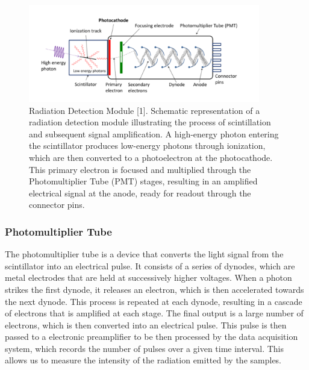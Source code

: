 \documentclass[12pt]{article}
\begin{document}
                \begin{figure}[!htb]
                        \centering
                        \includegraphics[width=0.9\textwidth]{./img/other/module.png}
                        \caption{Radiation Detection Module [1].  Schematic representation of a radiation detection module illustrating the process of scintillation and subsequent signal amplification. A high-energy photon entering the scintillator produces low-energy photons through ionization, which are then converted to a photoelectron at the photocathode. This primary electron is focused and multiplied through the Photomultiplier Tube (PMT) stages, resulting in an amplified electrical signal at the anode, ready for readout through the connector pins.}
                        \label{fig:Radiation Detection Module [1]}
                \end{figure}

                \subsubsection{Photomultiplier Tube}
                        The photomultiplier tube is a device that converts the light signal from the scintillator
                        into an electrical pulse. It consists of a series of dynodes, which are metal electrodes
                        that are held at successively higher voltages. When a photon strikes the first dynode, it
                        releases an electron, which is then accelerated towards the next dynode. This process is
                        repeated at each dynode, resulting in a cascade of electrons that is amplified at each stage.
                        The final output is a large number of electrons, which is then converted into an electrical
                        pulse. This pulse is then passed to a electronic preamplifier to be then processed by the
                        data acquisition system, which records the number of pulses over a given time interval.
                        This allows us to measure the intensity of the radiation emitted by the samples.
\end{document}
